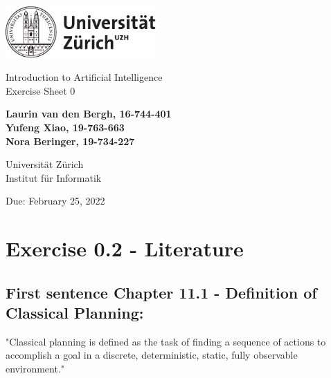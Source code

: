 \documentclass[12pt]{article}
\begin{document}
\begin{titlepage}
\includegraphics[height=20mm]{images/uzh_logo}\\

\begin{flushleft}

\vspace{2cm}

{\Large Introduction to Artificial Intelligence\\Exercise Sheet 0}\\

\vspace{4cm}

\textbf{Laurin van den Bergh, 16-744-401\\Yufeng Xiao, 19-763-663\\Nora Beringer, 19-734-227}\\

\vspace{2cm}

Universität Zürich\\
Institut für Informatik

\vfill Due: February 25, 2022

\vspace{3cm}


\end{flushleft}
\end{titlepage}

\newpage

\section*{Exercise 0.2 - Literature}

\subsection*{First sentence Chapter 11.1 - Definition of Classical Planning:}

"Classical planning is defined as the task of finding a sequence of actions to accomplish a goal in a discrete, deterministic, static, fully observable environment."
\end{document}

